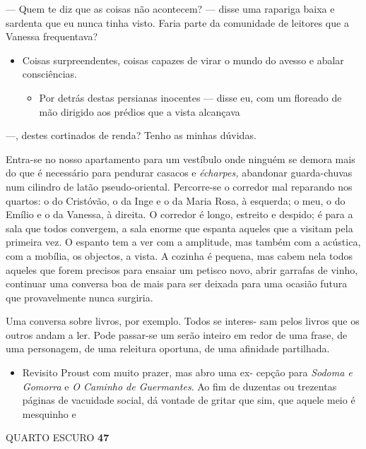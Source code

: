 --- Quem te diz que as coisas não acontecem? --- disse uma rapariga
baixa e sardenta que eu nunca tinha visto. Faria parte da comunidade de
leitores que a Vanessa frequentava?

\begin{itemize}
\item
  Coisas surpreendentes, coisas capazes de virar o mundo do avesso e
  abalar consciências.

  \begin{itemize}
  \tightlist
  \item
    Por detrás destas persianas inocentes --- disse eu, com um floreado
    de mão dirigido aos prédios que a vista alcançava
  \end{itemize}
\end{itemize}

---, destes cortinados de renda? Tenho as minhas dúvidas.

Entra-se no nosso apartamento para um vestíbulo onde ninguém se demora
mais do que é necessário para pendurar casacos e \emph{écharpes,
}abandonar guarda-chuvas num cilindro de latão pseudo-oriental.
Percorre-se o corredor mal reparando nos quartos: o do Cristóvão, o da
Inge e o da Maria Rosa, à esquerda; o meu, o do Emílio e o da Vanessa, à
direita. O corredor é longo, estreito e despido; é para a sala que todos
convergem, a sala enorme que espanta aqueles que a visitam pela primeira
vez. O espanto tem a ver com a amplitude, mas também com a acústica, com
a mobília, os objectos, a vista. A cozinha é pequena, mas cabem nela
todos aqueles que forem precisos para ensaiar um petisco novo, abrir
garrafas de vinho, continuar uma conversa boa de mais para ser deixada
para uma ocasião futura que provavelmente nunca surgiria.

Uma conversa sobre livros, por exemplo. Todos se interes- sam pelos
livros que os outros andam a ler. Pode passar-se um serão inteiro em
redor de uma frase, de uma personagem, de uma releitura oportuna, de uma
afinidade partilhada.

\begin{itemize}
\tightlist
\item
  Revisito Proust com muito prazer, mas abro uma ex- cepção para
  \emph{Sodoma e Gomorra }e \emph{O Caminho de Guermantes}. Ao fim de
  duzentas ou trezentas páginas de vacuidade social, dá vontade de
  gritar que sim, que aquele meio é mesquinho e
\end{itemize}

QUARTO ESCURO \textbf{47}

